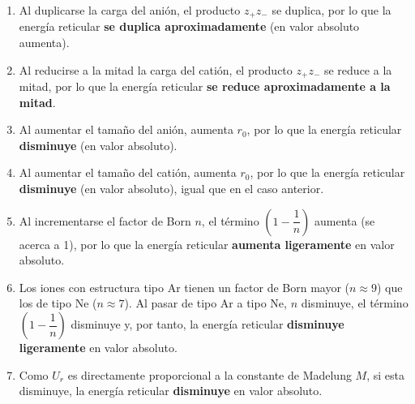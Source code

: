 \begin{exercise}
\begin{solu}
        \begin{enumerate}[label=\letraminuscula]
            \item Al duplicarse la carga del anión, el producto \(z_+ z_-\) se duplica, por lo que la energía reticular \textbf{se duplica aproximadamente} (en valor absoluto aumenta).
            \item Al reducirse a la mitad la carga del catión, el producto \(z_+ z_-\) se reduce a la mitad, por lo que la energía reticular \textbf{se reduce aproximadamente a la mitad}.
            \item Al aumentar el tamaño del anión, aumenta \(r_0\), por lo que la energía reticular \textbf{disminuye} (en valor absoluto).
            \item Al aumentar el tamaño del catión, aumenta \(r_0\), por lo que la energía reticular \textbf{disminuye} (en valor absoluto), igual que en el caso anterior.
            \item Al incrementarse el factor de Born \(n\), el término \(\left(1-\dfrac{1}{n}\right)\) aumenta (se acerca a 1), por lo que la energía reticular \textbf{aumenta ligeramente} en valor absoluto.
            \item Los iones con estructura tipo Ar tienen un factor de Born mayor (\(n\approx9\)) que los de tipo Ne (\(n\approx7\)). Al pasar de tipo Ar a tipo Ne, \(n\) disminuye, el término \(\left(1-\dfrac{1}{n}\right)\) disminuye y, por tanto, la energía reticular \textbf{disminuye ligeramente} en valor absoluto.
            \item Como \(U_r\) es directamente proporcional a la constante de Madelung \(M\), si esta disminuye, la energía reticular \textbf{disminuye} en valor absoluto.
        \end{enumerate}
    \end{solu}
\end{exercise}


